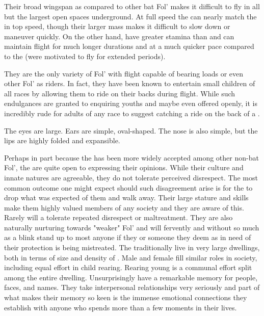\documentclass[twoside, 12pt, letterpaper]{report}\usepackage[]{graphicx}\usepackage[]{color}
\begin{document}
\begin{multicols*}{2}
Their broad wingspan as compared to other bat Fol' makes it difficult to fly in all but the largest open spaces underground. At full speed the \ftbat can nearly match the \vmbat in top speed, though their larger mass makes it difficult to slow down or maneuver quickly. On the other hand, \ftbat have greater stamina than \vmbat and can maintain flight for much longer durations and at a much quicker pace compared to the \vmbat (were \vmbat motivated to fly for extended periods). 

They are the only variety of Fol' with flight capable of bearing loads or even other Fol' as riders. In fact, they have been known to entertain small children of all races by allowing them to ride on their backs during flight. While such endulgances are granted to enquiring youths and maybe even offered openly, it is incredibly rude for adults of any race to suggest catching a ride on the back of a \ftbat. 

The eyes are large. Ears are simple, oval-shaped.  The nose is also simple, but the lips are highly folded and expansible.

Perhaps in part because the \ftbat has been more widely accepted among other non-bat Fol', the \ftbat are quite open to expressing their opinions. While their culture and innate natures are agreeable, they do not tolerate perceived disrespect. The most common outcome one might expect should such disagreement arise is for the \ftbat to drop what was expected of them and walk away. Their large stature and skills make them highly valued members of any society and they are aware of this. Rarely will a \ftbat tolerate repeated disrespect or maltreatment. They are also naturally nurturing towards "weaker" Fol' and will fervently and without so much as a blink stand up to most anyone if they or someone they deem as in need of their protection is being mistreated. The \ftbat traditionally live in very large dwellings, both in terms of size and density of \ftbat. Male and female \ftbat fill similar roles in \ftbat society, including equal effort in child rearing. Rearing \ftbat young is a communal effort split among the entire dwelling. Unsurprisingly \ftbat have a remarkable memory for people, faces, and names. They take interpersonal relationships very seriously and part of what makes their memory so keen is the immense emotional connections they establish with anyone who spends more than a few moments in their lives.


\end{multicols*}
\end{document}
